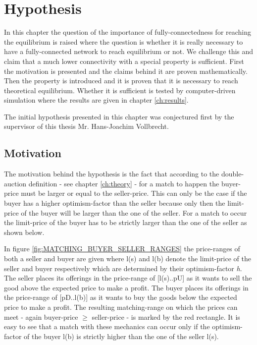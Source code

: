 \documentclass[Bachelorarbeit.tex]{subfiles}
\begin{document}
\graphicspath{{./figures/hypothesis/}}	%

\chapter{Hypothesis}
\label{ch:hypothesis}

In this chapter the question of the importance of fully-connectedness for reaching the equilibrium is raised where the question is whether it is really necessary to have a fully-connected network to reach equilibrium or not. We challenge this and claim that a much lower connectivity with a special property is sufficient. First the motivation is presented and the claims behind it are proven mathematically. Then the property is introduced and it is proven that it is necessary to reach theoretical equilibrium. Whether it is sufficient is tested by computer-driven simulation where the results are given in chapter \ref{ch:results}.

\medskip

The initial hypothesis presented in this chapter was conjectured first by the supervisor of this thesis Mr. Hans-Joachim Vollbrecht.

\section{Motivation}
The motivation behind the hypothesis is the fact that according to the double-auction definition - see chapter \ref{ch:theory} - for a match to happen the buyer-price must be larger or equal to the seller-price. This can only be the case if the buyer has a higher optimism-factor than the seller because only then the limit-price of the buyer will be larger than the one of the seller. For a match to occur the limit-price of the buyer has to be strictly larger than the one of the seller as shown below.

\medskip

In figure \ref{fig:MATCHING_BUYER_SELLER_RANGES} the price-ranges of both a seller and buyer are given where l(s) and l(b) denote the limit-price of the seller and buyer respectively which are determined by their optimism-factor \textit{h}. The seller places its offerings in the price-range of [l(s)..pU] as it wants to sell the good above the expected price to make a profit. The buyer places its offerings in the price-range of [pD..l(b)] as it wants to buy the goods below the expected price to make a profit. The resulting matching-range on which the prices can meet - again buyer-price $\geq$ seller-price - is marked by the red rectangle. It is easy to see that a match with these mechanics can occur only if the optimism-factor of the buyer l(b) is strictly higher than the one of the seller l(s).
\end{document}
